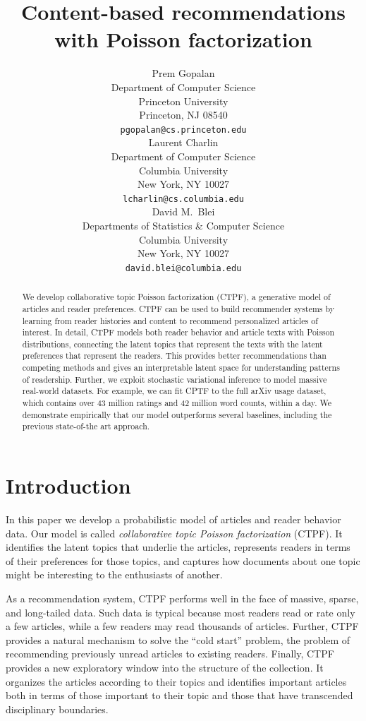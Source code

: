 \documentclass{article}
\title{Content-based recommendations\\ with Poisson factorization}
\author{
Prem Gopalan\\
Department of Computer Science\\
Princeton University\\
Princeton, NJ 08540\\
\texttt{pgopalan@cs.princeton.edu} \\
\And
Laurent Charlin\\
Department of Computer Science\\
Columbia University\\
New York, NY 10027\\
\texttt{lcharlin@cs.columbia.edu} \\
\And
David M.~Blei\\
Departments of Statistics \& Computer Science\\
Columbia University\\
New York, NY 10027\\
\texttt{david.blei@columbia.edu} \\
}
\begin{document}
\maketitle

\begin{abstract}
We develop collaborative topic Poisson factorization (CTPF), a
generative model of articles and reader preferences. CTPF can be used
to build recommender systems by learning from reader histories and
content to recommend personalized articles of interest.  In detail,
CTPF models both reader behavior and article texts with Poisson
distributions, connecting the latent topics that represent the texts
with the latent preferences that represent the readers.  This provides
better recommendations than competing methods and gives an
interpretable latent space for understanding patterns of readership.
Further, we exploit stochastic variational inference to model massive
real-world datasets. For example, we can fit CPTF to the full arXiv
usage dataset, which contains over 43 million ratings and 42 million
word counts, within a day.  We demonstrate empirically that our model
outperforms several baselines, including the previous state-of-the art
approach.
\end{abstract}

\section{Introduction}

In this paper we develop a probabilistic model of articles and reader behavior
data. Our model is called \textit{collaborative topic Poisson factorization}
(CTPF).  It identifies the latent topics that underlie the articles, represents
readers in terms of their preferences for those topics, and captures how
documents about one topic might be interesting to the enthusiasts of another.

As a recommendation system, CTPF performs well in the face of massive,
sparse, and long-tailed data. Such data is typical because most
readers read or rate only a few articles, while a few readers may read
thousands of articles.  Further, CTPF provides a natural mechanism to
solve the ``cold start'' problem, the problem of recommending
previously unread articles to existing readers. Finally, CTPF provides
a new exploratory window into the structure of the collection. It
organizes the articles according to their topics and identifies
important articles both in terms of those important to their topic and
those that have transcended disciplinary boundaries.
\end{document}
